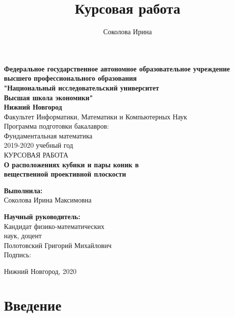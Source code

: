 \documentclass[14pt]{article}
\title{Курсовая работа}
\author{Соколова Ирина}
\begin{document}
\pagestyle{plain}
\makeatletter

\begin{titlepage}
\begin{center}
\textbf{Федеральное государственное автономное образовательное учреждение}\\
\textbf{высшего профессионального образования}\\
\textbf{"Национальный исследовательский университет}\\
\textbf{Высшая школа экономики"}\\
\textbf{Нижний Новгород}\\
\bigskip
\bigskip
\bigskip
\bigskip
\bigskip
\bigskip
\bigskip
\bigskip
\normalsize{Факультет Информатики,  Математики и Компьютерных Наук}\\
\normalsize{Программа подготовки бакалавров:}\\
\normalsize{ Фундаментальная математика}\\
\normalsize{ 2019-2020 учебный год}\\
\bigskip
\bigskip
\bigskip
\bigskip
\bigskip
\footnotesize\uppercase{курсовая работа}\\
\bigskip
\textbf{\large{О расположениях кубики и пары коник в}}\\
\textbf{\large{вещественной проективной плоскости}}\\
\end{center}
\bigskip
\bigskip
\bigskip
\bigskip
\bigskip
\begin{flushright}
\textbf{Выполнила:}\\
\normalsize{Соколова Ирина Максимовна}\\
\end{flushright}
\begin{flushleft}
\textbf{Научный руководитель:}\\
\normalsize{Кандидат физико-математических}\\
\normalsize{наук, доцент}\\
\normalsize{Полотовский Григорий Михайлович}\\
\normalsize{Подпись:}
\bigskip
\bigskip
\end{flushleft}
\vfill
\begin{center} Нижний Новгород, 2020 \end{center}
\end{titlepage}

\tableofcontents

\newpage
\section{Введение}
\end{document}

